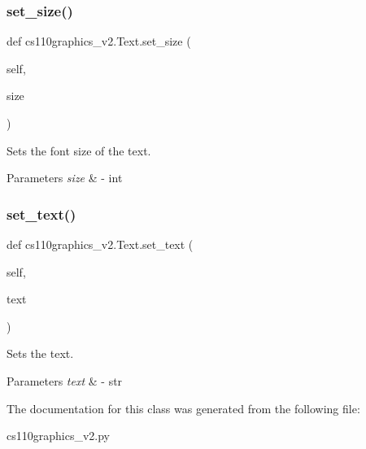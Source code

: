 \subsubsection{\texorpdfstring{set\_size()}{set\_size()}}
{\footnotesize\ttfamily def cs110graphics\+\_\+v2.\+Text.\+set\+\_\+size (\begin{DoxyParamCaption}\item[{}]{self,  }\item[{}]{size }\end{DoxyParamCaption})}



Sets the font size of the text. 


\begin{DoxyParams}{Parameters}
{\em size} & -\/ int \\
\hline
\end{DoxyParams}
\mbox{\label{classcs110graphics__v2_1_1Text_ac3a40d1edd6f17ab57a372b193a4e70f}} 
\subsubsection{\texorpdfstring{set\_text()}{set\_text()}}
{\footnotesize\ttfamily def cs110graphics\+\_\+v2.\+Text.\+set\+\_\+text (\begin{DoxyParamCaption}\item[{}]{self,  }\item[{}]{text }\end{DoxyParamCaption})}



Sets the text. 


\begin{DoxyParams}{Parameters}
{\em text} & -\/ str \\
\hline
\end{DoxyParams}


The documentation for this class was generated from the following file\+:\begin{DoxyCompactItemize}
\item 
cs110graphics\+\_\+v2.\+py\end{DoxyCompactItemize}
